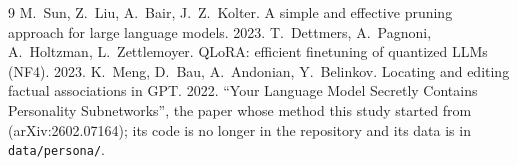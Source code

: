 \documentclass[11pt]{article}
\newcommand{\code}[1]{\texttt{#1}}
\begin{document}
\begin{thebibliography}{9}\small
{} M.~Sun, Z.~Liu, A.~Bair, J.~Z.~Kolter. A simple and effective pruning approach for large language models. 2023.
 T.~Dettmers, A.~Pagnoni, A.~Holtzman, L.~Zettlemoyer. QLoRA: efficient finetuning of quantized LLMs (NF4). 2023.
 K.~Meng, D.~Bau, A.~Andonian, Y.~Belinkov. Locating and editing factual associations in GPT. 2022.
 ``Your Language Model Secretly Contains Personality Subnetworks'', the paper whose method this study started from (arXiv:2602.07164); its code is no longer in the repository and its data is in \code{data/persona/}.
\end{thebibliography}
\end{document}
